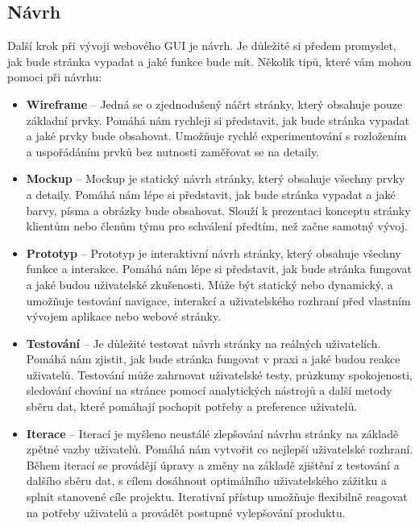 \subsection{Návrh}
\label{subsec:design}

Další krok při vývoji webového GUI je návrh. Je důležité si předem promyslet, jak bude stránka vypadat a jaké funkce bude mít. Několik tipů, které vám mohou pomoci při návrhu:

\begin{itemize}
  \item \textbf{Wireframe} -- Jedná se o zjednodušený náčrt stránky, který obsahuje pouze základní prvky. Pomáhá nám rychleji si představit, jak bude stránka vypadat a jaké prvky bude obsahovat. Umožňuje rychlé experimentování s rozložením a uspořádáním prvků bez nutnosti zaměřovat se na detaily.
  \item \textbf{Mockup} -- Mockup je statický návrh stránky, který obsahuje všechny prvky a detaily. Pomáhá nám lépe si představit, jak bude stránka vypadat a jaké barvy, písma a obrázky bude obsahovat. Slouží k prezentaci konceptu stránky klientům nebo členům týmu pro schválení předtím, než začne samotný vývoj.
  \item \textbf{Prototyp} -- Prototyp je interaktivní návrh stránky, který obsahuje všechny funkce a interakce. Pomáhá nám lépe si představit, jak bude stránka fungovat a jaké budou uživatelské zkušenosti. Může být statický nebo dynamický, a umožňuje testování navigace, interakcí a uživatelského rozhraní před vlastním vývojem aplikace nebo webové stránky.
  \item \textbf{Testování} -- Je důležité testovat návrh stránky na reálných uživatelích. Pomáhá nám zjistit, jak bude stránka fungovat v praxi a jaké budou reakce uživatelů. Testování může zahrnovat uživatelské testy, průzkumy spokojenosti, sledování chování na stránce pomocí analytických nástrojů a další metody sběru dat, které pomáhají pochopit potřeby a preference uživatelů.
  \item \textbf{Iterace} -- Iterací je myšleno neustálé zlepšování návrhu stránky na základě zpětné vazby uživatelů. Pomáhá nám vytvořit co nejlepší uživatelské rozhraní. Během iterací se provádějí úpravy a změny na základě zjištění z testování a dalšího sběru dat, s cílem dosáhnout optimálního uživatelského zážitku a splnit stanovené cíle projektu. Iterativní přístup umožňuje flexibilně reagovat na potřeby uživatelů a provádět postupné vylepšování produktu.
\end{itemize}

